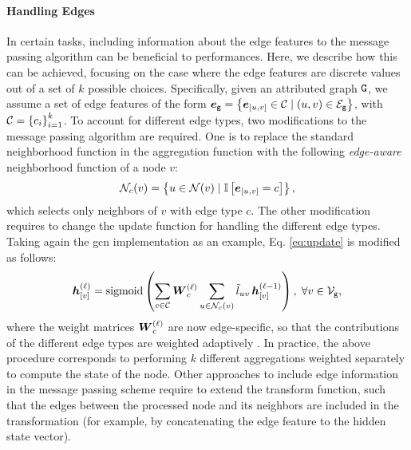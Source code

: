 \paragraph{Handling Edges}
In certain tasks, including information about the edge features to the message passing algorithm can be beneficial to performances. Here, we describe how this can be achieved, focusing on the case where the edge features are discrete values out of a set of $k$ possible choices. Specifically, given an attributed graph $\AttrGraph{g}$, we assume a set of edge features of the form $\GraphFeatures{e}{g} = \Set{\Elem{e}{u,v} \in \Cal{C} \mid (u, v) \in \Edges{g}}$, with $\Cal{C} = \Set{c_i}_{i=1}^k$. To account for different edge types, two modifications to the message passing algorithm are required. One is to replace the standard neighborhood function in the aggregation function with the following \emph{edge-aware} neighborhood function of a node $v$:
$$\Neigh_c(v) = \Set{u \in \Neigh(v) \mid \Indicator{\Elem{e}{u, v} = c}},$$
which selects only neighbors of $v$ with edge type $c$. The other modification requires to change the update function for handling the different edge types. Taking again the \gls{gcn} implementation as an example, Eq. \ref{eq:update} is modified as follows:
\begin{align*}
    \StateVector{v}{\ell} = \sigmoid\Par{\sum_{c \in \Cal{C}} \LayerMatrix{w}{\ell}_c \sum_{u \in \Neigh_c(v)} \tilde{l}_{uv}\,\Elem{h}{v}^{(\ell-1)}},\; \forall v \in \Nodes{g},
\end{align*}
where the weight matrices $\LayerMatrix{w}{\ell}_c $ are now edge-specific, so that the contributions of the different edge types are weighted adaptively \citep{micheli2009nn4g,schlichtkrull2018relationaldatagcn}. In practice, the above procedure corresponds to performing $k$ different aggregations weighted separately to compute the state of the node. Other approaches to include edge information in the message passing scheme require to extend the transform function, such that the edges between the processed node and its neighbors are included in the transformation (for example, by concatenating the edge feature to the hidden state vector).

